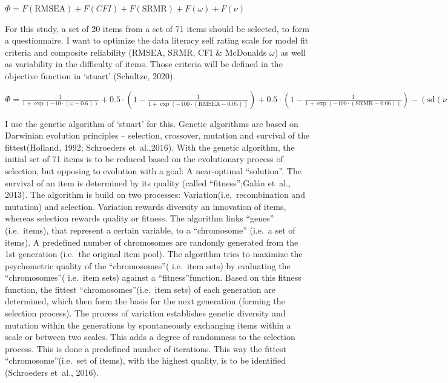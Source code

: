 \documentclass[
  12pt,
  a4paper,
  twoside]{article}
\begin{document}
\begin{center}
$\Phi = F(\textrm{RMSEA}) + F(CFI)+ F(\textrm{SRMR}) + F(\omega) + F(\nu)$
\end{center}

For this study, a set of 20 items from a set of 71 items should be selected, to form a questionnaire. I want to optimize the data literacy self rating scale for model fit criteria and composite reliability (RMSEA, SRMR, CFI \& McDonalds \(\omega\)) as well as variability in the difficulty of items. Those criteria will be defined in the objective function in `stuart' (Schultze, 2020).

\begin{center}
$\Phi = \frac{1}{1 + \exp(-10 \cdot (\omega - 0.6))} + 0.5 \cdot \left(1 - \frac{1}{1 + \exp(-100 \cdot (\textrm{RMSEA} - 0.05))}\right) + 0.5 \cdot \left(1 - \frac{1}{1 + \exp(-100 \cdot (\textrm{SRMR} - 0.06))}\right) - (\textrm{sd}(\nu) - 1.62)^2 + 1.62^2 + 10^{-6}$
\end{center}

I use the genetic algorithm of `stuart' for this. Genetic algorithms are based on Darwinian evolution principles -- selection, crossover, mutation and survival of the fittest(Holland, 1992; Schroeders et~al.,2016). With the genetic algorithm, the initial set of 71 items is to be reduced based on the evolutionary process of selection, but opposing to evolution with a goal: A near-optimal ``solution''. The survival of an item is determined by its quality (called ``fitness'';Galán et~al., 2013). The algorithm is build on two processes: Variation(i.e.~recombination and mutation) and selection. Variation rewards diversity an innovation of items, whereas selection rewards quality or fitness. The algorithm links ``genes'' (i.e.~items), that represent a certain variable, to a ``chromosome'' (i.e.~a set of items). A predefined number of chromosomes are randomly generated from the 1st generation (i.e.~the original item pool). The algorithm tries to maximize the psychometric quality of the ``chromosomes''( i.e.~item sets) by evaluating the ``chromosomes''( i.e.~item sets) against a ``fitness''function. Based on this fitness function, the fittest ``chromosomes''(i.e.~item sets) of each generation are determined, which then form the basis for the next generation (forming the selection process). The process of variation establishes genetic diversity and mutation within the generations by spontaneously exchanging items within a scale or between two scales. This adds a degree of randomness to the selection process. This is done a predefined number of iterations. This way the fittest ``chromosome''(i.e.~set of items), with the highest quality, is to be identified (Schroeders et~al., 2016).
\end{document}
